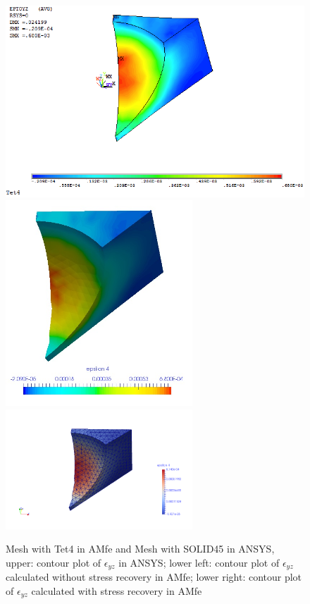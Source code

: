 \begin{figure}[htbp]
	\begin{center}
		\includegraphics[width=13cm,clip]{Tet4Eyz.png} 	
		\includegraphics[width=7cm,clip]{Tet4EyzPD.png} 			
		\includegraphics[width=7cm,clip]{Tet4EyzP.png} 		
		\caption{Mesh with Tet4 in AMfe and Mesh with SOLID45 in ANSYS, upper: contour plot of $\epsilon_{yz}$ in ANSYS; lower left: contour plot of $\epsilon_{yz}$ calculated without stress recovery in AMfe; lower right: contour plot of $\epsilon_{yz}$ calculated with stress recovery in AMfe} \label{fig: Tet4_Eyz}
	\end{center}
\end{figure}
\clearpage 

